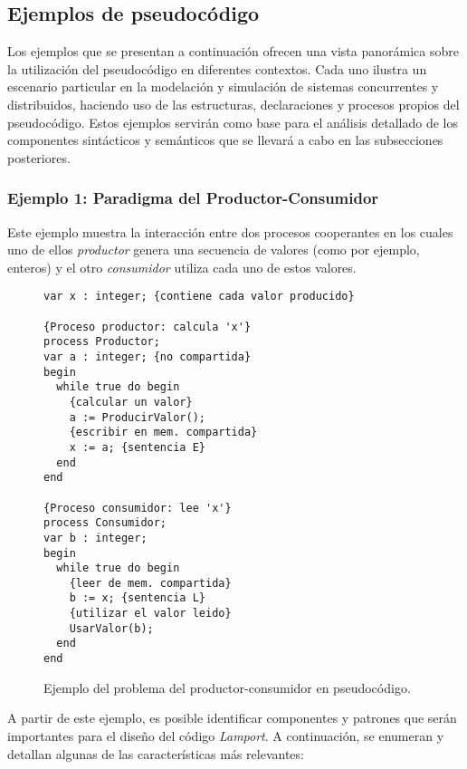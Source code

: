 \subsection{Ejemplos de pseudocódigo}\label{subsec:pseudoAnalisisEjemplos}

Los ejemplos que se presentan a continuación ofrecen una vista panorámica sobre la utilización del pseudocódigo en diferentes contextos. Cada uno ilustra un escenario particular en la modelación y simulación de sistemas concurrentes y distribuidos, haciendo uso de las estructuras, declaraciones y procesos propios del pseudocódigo. Estos ejemplos servirán como base para el análisis detallado de los componentes sintácticos y semánticos que se llevará a cabo en las subsecciones posteriores.

\subsubsection{Ejemplo 1: Paradigma del Productor-Consumidor}\label{subsubsec:pseudoAnalisisEjemplo1}
Este ejemplo muestra la interacción entre dos procesos cooperantes en los cuales uno de ellos \textit{productor} genera una secuencia de valores (como por ejemplo, enteros) y el otro \textit{consumidor} utiliza cada uno de estos valores.

\begin{figure}[h]
\begin{lstlisting}[style=lamportStyle]
var x : integer; {contiene cada valor producido}

{Proceso productor: calcula 'x'}
process Productor;
var a : integer; {no compartida}
begin
  while true do begin
    {calcular un valor}
    a := ProducirValor();
    {escribir en mem. compartida}
    x := a; {sentencia E}
  end
end

{Proceso consumidor: lee 'x'}
process Consumidor;
var b : integer;
begin
  while true do begin
    {leer de mem. compartida}
    b := x; {sentencia L}
    {utilizar el valor leido}
    UsarValor(b);
  end
end
\end{lstlisting}
\caption{Ejemplo del problema del productor-consumidor en pseudocódigo.}
\label{fig:ejemplo1}
\end{figure}

\newpage


A partir de este ejemplo, es posible identificar componentes y patrones que serán importantes para el diseño del código \textit{Lamport}. A continuación, se enumeran y detallan algunas de las características más relevantes:

